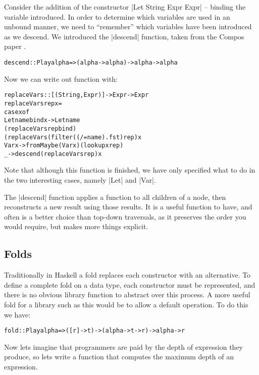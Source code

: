 \documentclass[preprint]{sigplanconf}
\newenvironment{code}{\begin{alltt}\small}{\end{alltt}}
\begin{document}
Consider the addition of the constructor |Let String Expr Expr| -- binding the variable introduced. In order to determine which variables are used in an unbound manner, we need to ``remember'' which variables have been introduced as we descend. We introduced the |descend| function, taken from the Compos paper \cite{compos}.

\begin{code}
descend :: Play alpha => (alpha -> alpha) -> alpha -> alpha
\end{code}

Now we can write out function with:

\begin{code}
replaceVars :: [(String,Expr)] -> Expr -> Expr
replaceVars rep x =
    case  x of
          Let name bind x -> Let name
              (replaceVars rep bind)
              (replaceVars (filter ((/= name) . fst) rep) x
          Var x -> fromMaybe (Var x) (lookup x rep)
          _ -> descend (replaceVars rep) x
\end{code}

Note that although this function is finished, we have only specified what to do in the two interesting cases, namely |Let| and |Var|.

The |descend| function applies a function to all children of a node, then reconstructs a new result using those results. It is a useful function to have, and often is a better choice than top-down traversals, as it preserves the order you would require, but makes more things explicit.


\subsection{Folds}

Traditionally in Haskell a fold replaces each constructor with an alternative. To define a complete fold on a data type, each constructor must be represented, and there is no obvious library function to abstract over this process. A more useful fold for a library such as this would be to allow a default operation. To do this we have:

\begin{code}
fold :: Play alpha => ([r] -> t) -> (alpha -> t -> r) -> alpha -> r
\end{code}

Now lets imagine that programmers are paid by the depth of expression they produce, so lets write a function that computes the maximum depth of an expression.
\end{document}
